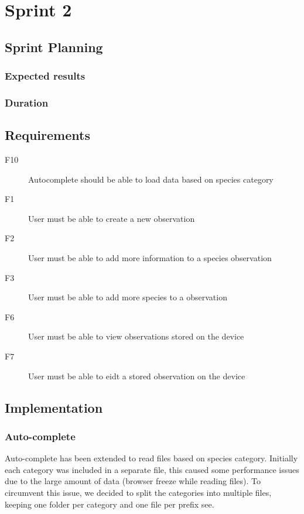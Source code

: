 \section{Sprint 2}

\subsection{Sprint Planning}

	\subsubsection{Expected results}
	
	\subsubsection{Duration}

\subsection{Requirements}

\begin{description}
	\item[F10] Autocomplete should be able to load data based on species category
	\item[F1] User must be able to create a new observation 
	\item[F2] User must be able to add more information to a species observation
	\item[F3] User must be able to add more species to a observation
	\item[F6] User must be able to view observations stored on the device
	\item[F7] User must be able to eidt a stored observation on the device
\end{description}

\subsection{Implementation}


	\subsubsection{Auto-complete}

	Auto-complete has been extended to read files based on species category.
	Initially each category was included in a separate file, this caused some
	performance issues due to the large amount of data (browser freeze while reading
	files). To circumvent this issue, we decided to split the categories into
	multiple files, keeping one folder per category and one file per prefix see.

